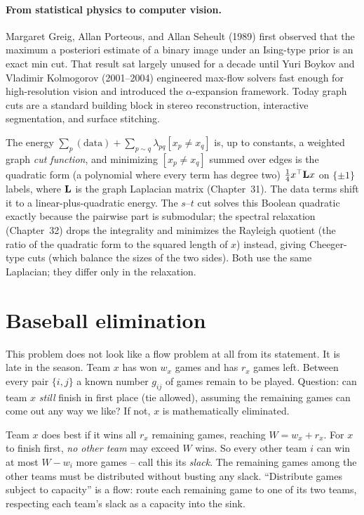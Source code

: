 \paragraph{From statistical physics to computer vision.}
Margaret Greig, Allan Porteous, and Allan Seheult (1989) first observed that the maximum a posteriori estimate of a binary image under an Ising-type prior is an exact min cut. That result sat largely unused for a decade until Yuri Boykov and Vladimir Kolmogorov (2001--2004) engineered max-flow solvers fast enough for high-resolution vision and introduced the $\alpha$-expansion framework. Today graph cuts are a standard building block in stereo reconstruction, interactive segmentation, and surface stitching.

\begin{connectionbox}
The energy $\sum_p (\text{data}) + \sum_{p\sim q}\lambda_{pq}[x_p\ne x_q]$ is, up to constants, a weighted graph \emph{cut function}, and minimizing $[x_p\ne x_q]$ summed over edges is the quadratic form (a polynomial where every term has degree two) $\tfrac14 x^\top \mathbf{L} x$ on $\{\pm1\}$ labels, where $\mathbf{L}$ is the graph Laplacian matrix (Chapter~31). The data terms shift it to a linear-plus-quadratic energy. The $s$--$t$ cut solves this Boolean quadratic exactly because the pairwise part is submodular; the spectral relaxation (Chapter~32) drops the integrality and minimizes the Rayleigh quotient (the ratio of the quadratic form to the squared length of $x$) instead, giving Cheeger-type cuts (which balance the sizes of the two sides). Both use the same Laplacian; they differ only in the relaxation.
\end{connectionbox}

\section{Baseball elimination}
\label{ch18:baseball}

This problem does not look like a flow problem at all from its statement. It is late in the season. Team $x$ has won $w_x$ games and has $r_x$ games left. Between every pair $\{i,j\}$ a known number $g_{ij}$ of games remain to be played. Question: can team $x$ \emph{still} finish in first place (tie allowed), assuming the remaining games can come out any way we like? If not, $x$ is mathematically eliminated.

\begin{intuitionbox}
Team $x$ does best if it wins all $r_x$ remaining games, reaching $W = w_x + r_x$. For $x$ to finish first, \emph{no other team} may exceed $W$ wins. So every other team $i$ can win at most $W - w_i$ more games -- call this its \emph{slack}. The remaining games among the other teams must be distributed without busting any slack. ``Distribute games subject to capacity'' is a flow: route each remaining game to one of its two teams, respecting each team's slack as a capacity into the sink.
\end{intuitionbox}

